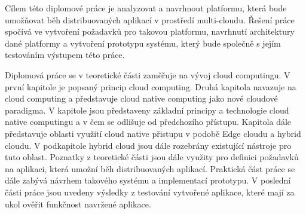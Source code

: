 	\par
	    Cílem této diplomové práce je analyzovat a navrhnout platformu, která bude umožňovat běh distribuovaných aplikací v prostředí multi-cloudu. Řešení práce spočívá \linebreak ve vytvoření požadavků pro takovou platformu, navrhnutí architektury dané platformy a vytvoření prototypu systému, který bude společně s jejím testováním výstupem této práce. 
	    \par
	        Diplomová práce se v teoretické části zaměřuje na vývoj cloud computingu. V první kapitole je popsaný princip cloud computing. Druhá kapitola navazuje na cloud computing a představuje cloud native computing jako nové cloudové paradigma. V kapitole jsou představeny základní principy a technologie cloud native computingu a v čem se odlišuje od předchozího přístupu. Kapitola dále představuje oblasti využití cloud native přistupu v podobě Edge cloudu a hybrid cloudu. V podkapitole hybrid cloud jsou dále rozebrány existující nástroje pro tuto oblast. Poznatky z teoretické části jsou dále využity pro definici požadavků na aplikaci, která umožní běh distribuovaných aplikací. Praktická část práce se dále zabývá návrhem takového systému a implementací prototypu. V poslední části práce jsou uvedeny výsledky z testování vytvořené aplikace, které mají za ukol ověřit funkčnost navržené aplikace. 

